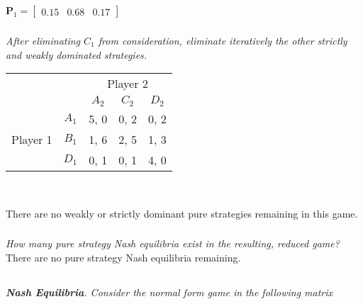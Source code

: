 \documentclass[12pt]{amsart}
\begin{document}
	\(\mathbf P_1 = \begin{bmatrix}0.15 & 0.68 & 0.17\end{bmatrix}\)

	\subsubsection{}
	\textit{After eliminating $C_1$ from consideration, eliminate iteratively the other strictly and
	weakly dominated strategies.} \\
	
	\begin{center}
		\def\arraystretch{1.25}%
		\begin{tabular}{ccccc}
			&                            & \multicolumn{3}{c}{Player 2}                                                         \\
			& \multicolumn{1}{c|}{}      & \multicolumn{1}{c|}{$A_2$} & \multicolumn{1}{c|}{$C_2$} & \multicolumn{1}{c|}{$D_2$} \\ \cline{2-5} 
			\multirow{3}{*}{Player 1} & \multicolumn{1}{c|}{$A_1$} & \multicolumn{1}{c|}{5, 0}  & \multicolumn{1}{c|}{0, 2}  & \multicolumn{1}{c|}{0, 2}  \\ \cline{2-5} 
			& \multicolumn{1}{c|}{$B_1$} & \multicolumn{1}{c|}{1, 6}  & \multicolumn{1}{c|}{2, 5}  & \multicolumn{1}{c|}{1, 3}  \\ \cline{2-5} 
			& \multicolumn{1}{c|}{$D_1$} & \multicolumn{1}{c|}{0, 1}  & \multicolumn{1}{c|}{0, 1}  & \multicolumn{1}{c|}{4, 0}  \\ \cline{2-5} 
		\end{tabular}\\[2ex]
	\end{center}
	
	There are no weakly or strictly dominant pure strategies remaining in this game.
 
	\subsubsection{}
	\textit{How many pure strategy Nash equilibria exist in the resulting, reduced game?} \\

	There are no pure strategy Nash equilibria remaining.


\subsection{}
\textit{\textbf{Nash Equilibria}. Consider the normal form game in the following matrix}
\end{document}
